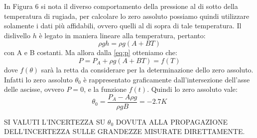 In Figura 6 si nota il diverso comportamento della pressione al di sotto della temperatura di rugiada, per calcolare lo zero assoluto possiamo quindi utilizzare solamente i dati più affidabili, ovvero quelli al di sopra di tale temperatura.
Il dislivello $h$ è legato in maniera lineare alla temperatura, pertanto:
\begin{equation}
\rho gh = \rho g (A + B T)
\end{equation}
con A e B costanti.
Ma allora dalla \eqref{eq:p} otteniamo che:
\begin{equation}
P = P_A + \rho g (A + B T) = f (T)
\end{equation}
dove $f(\theta)$ sarà la retta da considerare per la determinazione dello zero assoluto.
Infatti lo zero assoluto $\theta_0$ è rappresentato graficamente dall'intersezione dell'asse delle ascisse, ovvero $P = 0$, e la funzione $f(t)$.
Quindi lo zero assoluto vale: 
\begin{equation}
\theta_0 = \frac{P_A - A \rho g}{\rho gB} = -2.7 K
\end{equation}

SI VALUTI L'INCERTEZZA SU $\theta_0$ DOVUTA ALLA PROPAGAZIONE DELL'INCERTEZZA SULLE GRANDEZZE MISURATE DIRETTAMENTE.